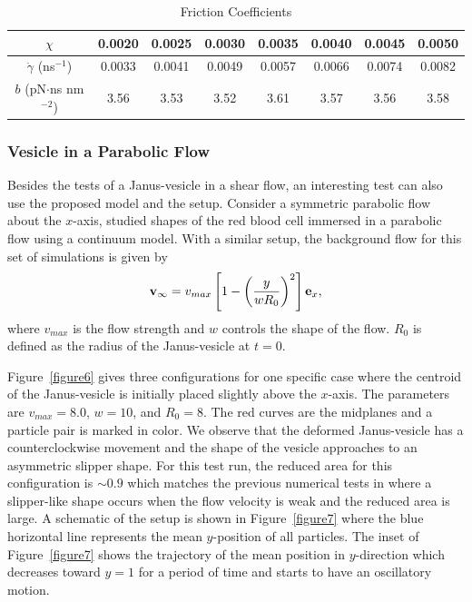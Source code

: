 \documentclass[lineno]{jfm}
\begin{document}
\begin{table}
\caption{Friction Coefficients}
\centering    
\begin{tabular}{c c c c c c c c }
 $\chi$ & 0.0020   &  0.0025 &  0.0030 &  0.0035 &  0.0040 & 0.0045 & 0.0050  \\
\hline                    
$\dot\gamma$ (ns$^{-1}$)        & 0.0033 & 0.0041 & 0.0049 & 0.0057 & 0.0066 & 0.0074 & 0.0082\\
$b$ (pN$\cdot$ns nm$^{-2}$)    & 3.56 & 3.53 & 3.52 & 3.61 & 3.57 & 3.56 & 3.58\\ 
\hline    
\end{tabular} 
\label{table1}
\end{table}


\subsubsection{Vesicle in a Parabolic Flow}

Besides the tests of a Janus-vesicle in a shear flow, an interesting test can also use the proposed model and the setup. Consider a symmetric parabolic flow about the $x$-axis, \cite{Kaoui09} studied shapes of the red blood cell immersed in a parabolic flow using a continuum model. With a similar setup, the background flow for this set of simulations is given by
\begin{equation}
{\bf v}_\infty = v_{max}\left[ 1 - \left( \frac{y}{wR_0}\right)^2 \right]{\bf e}_x,
\end{equation}
%
where $v_{max}$ is the flow strength and $w$ controls the shape of the flow. $R_0$ is defined as the radius of the Janus-vesicle at $t=0$. 

Figure~\ref{figure6} gives three configurations for one specific case where the centroid of the Janus-vesicle is initially placed slightly above the $x$-axis. The parameters are $v_{max} = 8.0$, $w=10$, and $R_0=8$. The red curves are the midplanes and a particle pair is marked in color. We observe that the deformed 
Janus-vesicle has a counterclockwise movement and the shape of the vesicle approaches to an asymmetric
slipper shape. For this test run, the reduced area for this configuration is $\sim0.9$ which matches the previous numerical tests in \cite{Kaoui09} where a slipper-like shape occurs when the flow velocity is weak and the reduced area is large. 
A schematic of the setup is shown in Figure~\ref{figure7} where the blue horizontal line represents the mean
$y$-position of all particles. The inset of Figure~\ref{figure7} shows the trajectory of the mean position in 
$y$-direction which decreases toward $y=1$ for a period of time and starts to have an oscillatory motion. 
\end{document}
